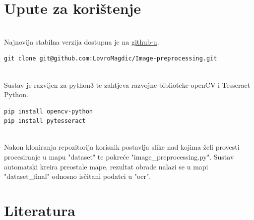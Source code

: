 \documentclass{article}
\begin{document}
\section{Upute za korištenje}
\\
Najnovija stabilna verzija dostupna je na \href{https://github.com/LovroMagdic/Image-preprocessing}{github-u}.
\begin{lstlisting}
git clone git@github.com:LovroMagdic/Image-preprocessing.git
\end{lstlisting}
\\
Sustav je razvijen za python3 te zahtjeva razvojne biblioteke openCV i Tesseract Python.
\begin{lstlisting}
pip install opencv-python
pip install pytesseract
\end{lstlisting}
\\
Nakon kloniranja repozitorija korisnik postavlja slike nad kojima želi provesti procesiranje u mapu "dataset" te pokreće "image\_preprocessing.py". Sustav automatski kreira preostale mape, rezultat obrade nalazi se u mapi "dataset\_final" odnosno isčitani podatci u "ocr". 
\newpage
\section{Literatura}
\end{document}
